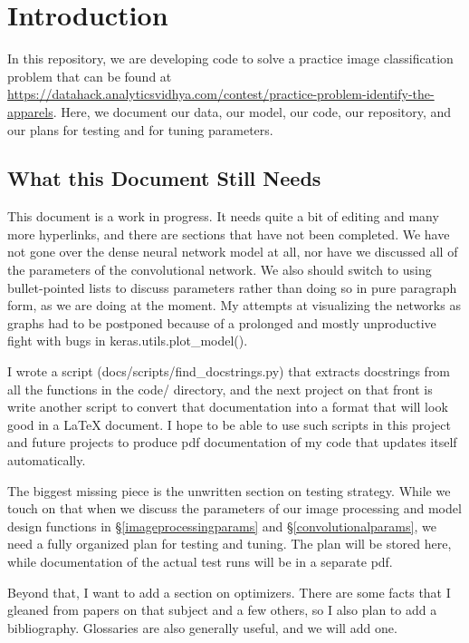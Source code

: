 \section{Introduction}
In this repository, we are developing code to solve a practice image classification problem that can be found at \url{https://datahack.analyticsvidhya.com/contest/practice-problem-identify-the-apparels}. Here, we document our data, our model, our code, our repository, and our plans for testing and for tuning parameters. 
\subsection{What this Document Still Needs}
This document is a work in progress. It needs quite a bit of editing and many more hyperlinks, and there are sections that have not been completed. We have not gone over the dense neural network model at all, nor have we discussed all of the parameters of the convolutional network. We also should switch to using bullet-pointed lists to discuss parameters rather than doing so in pure paragraph form, as we are doing at the moment. My attempts at visualizing the networks as graphs had to be postponed because of a prolonged and mostly unproductive fight with bugs in {\ttfamily keras.utils.plot\_model()}.

I wrote a script ({\ttfamily docs/scripts/find\_docstrings.py}) that extracts docstrings from all the functions in the {\ttfamily code/} directory, and the next project on that front is write another script to convert that documentation into a format that will look good in a LaTeX document. I hope to be able to use such scripts in this project and future projects to produce pdf documentation of my code that updates itself automatically.

The biggest missing piece is the unwritten section on testing strategy. While we touch on that when we discuss the parameters of our image processing and model design functions in \S\ref{imageprocessingparams} and \S\ref{convolutionalparams}, we need a fully organized plan for testing and tuning. The plan will be stored here, while documentation of the actual test runs will be in a separate pdf.

Beyond that, I want to add a section on optimizers. There are some facts that I gleaned from papers on that subject and a few others, so I also plan to add a bibliography. Glossaries are also generally useful, and we will add one.
